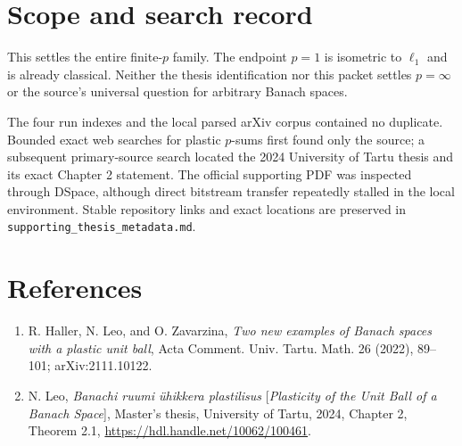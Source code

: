 \documentclass[11pt]{article}
\begin{document}
\section{Scope and search record}

This settles the entire finite-$p$ family.  The endpoint $p=1$ is isometric to
$\ell_1$ and is already classical.  Neither the thesis identification nor this
packet settles $p=\infty$ or the source's universal question for arbitrary
Banach spaces.

The four run indexes and the local parsed arXiv corpus contained no duplicate.
Bounded exact web searches for plastic $p$-sums first found only the source;
a subsequent primary-source search located the 2024 University of Tartu thesis
and its exact Chapter 2 statement.  The official supporting PDF was inspected
through DSpace, although direct bitstream transfer repeatedly stalled in the
local environment.  Stable repository links and exact locations are preserved
in \texttt{supporting\_thesis\_metadata.md}.

\section*{References}

\begin{enumerate}
\item R. Haller, N. Leo, and O. Zavarzina, \emph{Two new examples of Banach
spaces with a plastic unit ball}, Acta Comment. Univ. Tartu. Math. 26 (2022),
89--101; arXiv:2111.10122.
\item N. Leo, \emph{Banachi ruumi \"uhikkera plastilisus} [\emph{Plasticity
of the Unit Ball of a Banach Space}], Master's thesis, University of Tartu,
2024, Chapter 2, Theorem 2.1, \url{https://hdl.handle.net/10062/100461}.
\end{enumerate}
\end{document}
